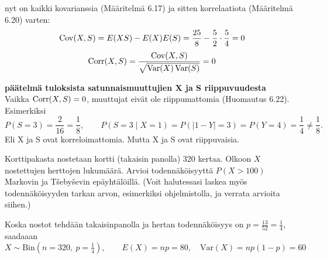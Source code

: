 \documentclass[12pt,a4paper]{article}
\begin{document}
\pagebreak
nyt on kaikki kovarianssia (Määritelmä 6.17) ja sitten korrelaatiota (Määritelmä 6.20) varten:
\[
\operatorname{Cov}(X,S)=E(XS)-E(X)E(S)
=\frac{25}{8}-\frac52\cdot\frac54=0
\]
\[
\operatorname{Corr}(X,S)=\frac{\operatorname{Cov}(X,S)}{\sqrt{\operatorname{Var}(X)\operatorname{Var}(S)}}=0
\]

\vspace{0.8cm}

\textbf{päätelmä tuloksista satunnaismuuttujien X ja S riippuvuudesta}\\

Vaikka $\operatorname{Corr}(X,S)=0$, muuttujat eivät ole riippumattomia (Huomautus 6.22).\\

Esimerkiksi
\[
P(S=3)=\frac{2}{16}=\frac18,\qquad
P(S=3\mid X=1)=P(|1-Y|=3)=P(Y=4)=\frac14\neq \frac18.
\]
Eli X ja S ovat korreloimattomia. Mutta X ja S ovat riippuvaisia.


\pagebreak
{}
Korttipakasta nostetaan kortti (takaisin panolla) 320 kertaa. Olkoon $X$ nostettujen herttojen lukumäärä. Arvioi todennäköisyyttä $P(X>100)$ Markovin ja T\v seby\v sevin epäyhtälöillä. (Voit halutessasi laskea myös todennäköisyyden tarkan arvon, esimerkiksi ohjelmistolla, ja verrata arvioita siihen.)

\vspace{0.4cm}

Koska nostot tehdään takaisinpanolla ja hertan todennäköisyys on $p=\tfrac{13}{52}=\tfrac14$, saadaaan
\[
X\sim\mathrm{Bin}(n=320,\ p=\tfrac14),\qquad
E(X)=np=80,\quad
\mathrm{Var}(X)=np(1-p)=60
\]
\end{document}
